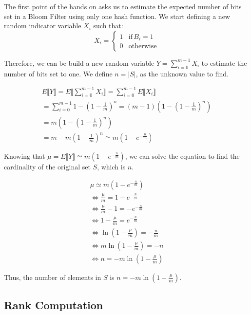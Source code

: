\documentclass{article}
\begin{document}
The first point of the hands on asks us to estimate the expected number of bits set in a Bloom Filter using only one hash function.
We start defining a new random indicator variable $X_i$ such that:
\begin{equation}
    X_i = \begin{cases}
        1 & \textrm{if} \, B_i = 1 \\
        0 & \textrm{otherwise}
    \end{cases}
\end{equation}

Therefore, we can be build a new random variable $Y = \sum_{i = 0}^{m - 1}X_i$ to estimate the number of bits set to one. We define $n = |S|$, as the unknown value to find. 

\begin{align*}
    E \llbracket Y \rrbracket = E \bigg\llbracket  \sum_{i = 0}^{m - 1}X_i \bigg\rrbracket = \sum_{i = 0}^{m - 1} E \llbracket X_i \rrbracket \\
    = \sum_{i = 0}^{m - 1} 1 - (1 - \frac{1}{m})^n = (m - 1)(1 - (1 - \frac{1}{m})^n) \\
    = m(1 - (1 - \frac{1}{m})^n) \\
    = m - m(1 - \frac{1}{m})^n \simeq m (1 - e^{-\frac{n}{m}})
\end{align*}

\noindent Knowing that $\mu = E \llbracket Y \rrbracket \simeq m (1 - e^{-\frac{n}{m}})$, we can solve the equation to find the cardinality of the original set $S$, which is $n$.

\begin{align*}
    \mu \simeq m (1 - e^{-\frac{n}{m}}) \\
    \iff \frac{\mu}{m} = 1 - e^{-\frac{n}{m}} \\
    \iff \frac{\mu}{m} - 1 = - e^{-\frac{n}{m}} \\
    \iff 1 - \frac{\mu}{m} = e^{-\frac{n}{m}} \\
    \iff \ln (1 - \frac{\mu}{m}) = -\frac{n}{m} \\
    \iff m \ln (1 - \frac{\mu}{m}) = - n \\
    \iff n = -m \ln (1 - \frac{\mu}{m})
\end{align*}

\noindent Thus, the number of elements in $S$ is $n =  -m \ln (1 - \frac{\mu}{m})$.

\subsection{Rank Computation}
\end{document}
